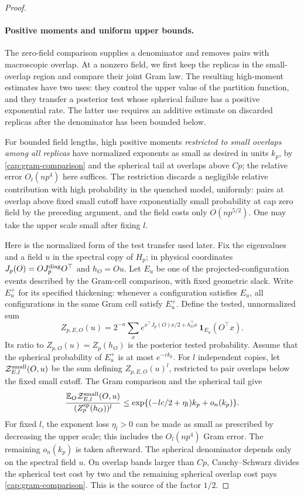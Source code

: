 \begin{proof}
\paragraph{Positive moments and uniform upper bounds.}
The zero-field comparison supplies a denominator and removes pairs with
macroscopic overlap. At a nonzero field, we first keep the replicas in the
small-overlap region and compare their joint Gram law. The resulting
high-moment estimates have two uses: they control the upper value of the
partition function, and they transfer a posterior test whose spherical
failure has a positive exponential rate. The latter use requires an
additive estimate on discarded replicas after the denominator has been
bounded below.

For bounded field lengths, high positive moments \emph{restricted to small
overlaps among all replicas} have normalized exponents as small as desired in
units \(k_p\), by \eqref{cap:gram-comparison} and the spherical tail at
overlaps above \(C p\); the relative error \(O_l(np^4)\) here suffices. The
restriction discards a negligible relative contribution with high probability
in the quenched model, uniformly: pairs at overlap above fixed small cutoff
have exponentially small probability at cap zero field by the preceding
argument, and the field costs only \(O(n p^{5/2})\). One may take the upper
scale small after fixing \(l\).

Here is the normalized form of the test transfer used later. Fix the
eigenvalues and a field \(u\) in the spectral copy of \(H_p\); in physical
coordinates \(J_p(O)=O J_p^{\rm diag}O^\top\) and \(h_O=Ou\).
Let \(E_u\) be one of the projected-configuration events described by the
Gram-cell comparison, with fixed geometric slack. Write \(E_u^+\) for its
specified thickening: whenever a configuration satisfies \(E_u\), all
configurations in the same Gram cell satisfy \(E_u^+\). Define the tested,
unnormalized sum
\[
 Z_{p,E,O}(u)=2^{-n}\sum_x
 e^{x^\top J_p(O)x/2+h_O^\top x}\,
       \mathbf1_{E_u}(O^\top x).
\]
Its ratio to \(Z_{p,O}(u)=Z_p(h_O)\) is the posterior tested probability.
Assume that the spherical probability of \(E_u^+\) is at most \(e^{-c k_p}\).
For \(l\) independent copies, let
\(\mathcal Z_{E,l}^{\rm small}(O,u)\) be the sum defining
\(Z_{p,E,O}(u)^l\), restricted to pair overlaps below the fixed small
cutoff. The Gram comparison and the spherical tail give
\begin{equation}\label{cap:tested-moment}
 \frac{\mathbb E_O\mathcal Z_{E,l}^{\rm small}(O,u)}
      {(Z_p^{\rm sp}(h_O))^l}
 \le \exp\{(-lc/2+\eta_l)k_p+o_n(k_p)\}.
\end{equation}
For fixed \(l\), the exponent loss \(\eta_l>0\) can be made as small as
prescribed by decreasing the upper scale; this includes the
\(O_l(np^4)\) Gram error. The remaining \(o_n(k_p)\) is taken afterward.
The spherical denominator depends only on the spectral field \(u\).
On overlap bands larger than \(Cp\), Cauchy--Schwarz divides the spherical
test cost by two and the remaining spherical overlap cost pays
\eqref{cap:gram-comparison}. This is the source of the factor \(1/2\).


\end{proof}
